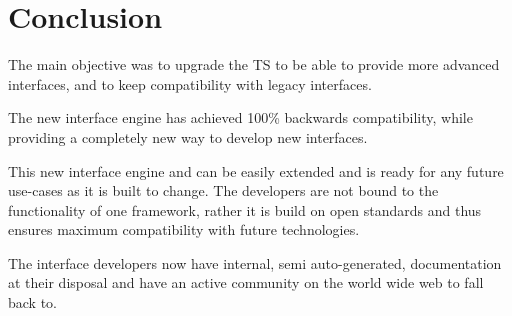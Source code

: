 \chapter{Conclusion}
The main objective was to upgrade the TS to be able to provide more advanced
interfaces, and to keep compatibility with legacy interfaces.

The new interface engine has achieved 100\% backwards compatibility, while
providing a completely new way to develop new interfaces.

This new interface engine and can be easily extended and is ready for any future
use-cases as it is built to change. The developers are not bound to the
functionality of one framework, rather it is build on open standards and thus
ensures maximum compatibility with future technologies.

The interface developers now have internal, semi auto-generated, documentation
at their disposal and have an active community on the world wide web to fall
back to.
